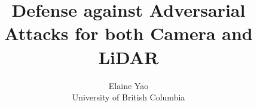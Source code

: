 \usepackage{filecontents}

\usepackage{algorithm}
\usepackage{algpseudocode}
\usepackage[colorinlistoftodos]{todonotes}
\usepackage{comment}




\date{}

\title{\Large \bf Defense against Adversarial Attacks for both Camera and LiDAR}

\author{
{\rm Elaine Yao}\\
University of British Columbia
} %

\maketitle

